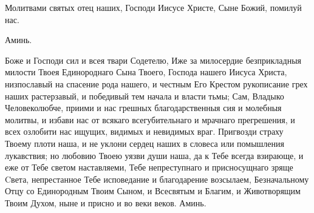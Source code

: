 \begin{mymulticols}
 Молитвами святых отец наших, Господи Иисусе Христе, Сыне Божий, помилуй нас.

 Аминь.



Боже и Господи сил и всея твари Содетелю, Иже за милосердие безприкладныя милости Твоея Единороднаго Сына Твоего, Господа нашего Иисуса Христа, низпославый на спасение рода нашего, и честным Его Крестом рукописание грех наших растерзавый, и победивый тем начала и власти тьмы; Сам, Владыко Человеколюбче, приими и нас грешных благодарственныя сия и молебныя молитвы, и избави нас от всякаго всегубительнаго и мрачнаго прегрешения, и всех озлобити нас ищущих, видимых и невидимых враг. Пригвозди страху Твоему плоти наша, и не уклони сердец наших в словеса или помышления лукавствия; но любовию Твоею уязви души наша, да к Тебе всегда взирающе, и еже от Тебе светом наставляеми, Тебе непреступнаго и присносущнаго зряще Cвета, непрестанное Тебе исповедание и благодарение возсылаем, Безначальному Отцу со Единородным Твоим Сыном, и Всесвятым и Благим, и Животворящим Твоим Духом, ныне и присно и во веки веков. Аминь.

\end{mymulticols}

\mychapterending

